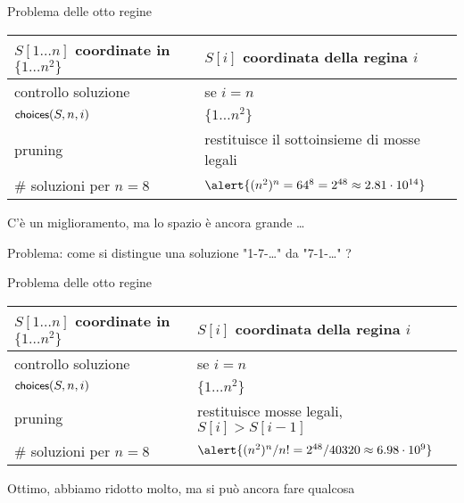 \begin{frame}{Problema delle otto regine}


\medskip
\begin{tabular}{|P{4cm}|P{7.1cm}|}
\hline
$S[1 \ldots n]$ coordinate in $\{ 1 \ldots n^2 \}$	&	$S[i]$ coordinata della regina $i$ \\\hline
controllo soluzione	& se $i = n$ \\\hline
$\textsf{{\small choices}}(S, n, i)$	&	$\{ 1 \ldots n^2 \}$ \\\hline
pruning	&	restituisce il sottoinsieme di mosse legali \\\hline
\# soluzioni per $n=8$ 	&		$\alert{(n^2)^n = 64^{8} = 2^{48}  \approx 2.81 \cdot 10^{14}}$\\\hline 
\end{tabular}

\smallskip
{}
\BI
\item C'è un miglioramento, ma lo spazio è ancora grande \ldots
\item Problema: come si distingue una soluzione "1-7-\ldots" da "7-1-\ldots" ?
\EI

\end{frame}

\begin{frame}{Problema delle otto regine}


\medskip
\begin{tabular}{|P{4cm}|P{7.1cm}|}
\hline
$S[1 \ldots n]$ coordinate in $\{ 1 \ldots n^2 \}$	&	$S[i]$ coordinata della regina $i$ \\\hline
controllo soluzione	& se $i = n$ \\\hline
$\textsf{{\small choices}}(S, n, i)$	&	$\{ 1 \ldots n^2 \}$ \\\hline
pruning	&	restituisce mosse legali, \alert{\small $S[i] > S[i-1]$} \\\hline
\# soluzioni per $n=8$ 	&		$\alert{(n^2)^n/n! = 2^{48}/40320 \approx 6.98 \cdot 10^{9}}$\\\hline 
\end{tabular}

\smallskip
{}
\BI
\item Ottimo, abbiamo ridotto molto, ma si può ancora fare qualcosa
\EI

\end{frame}



